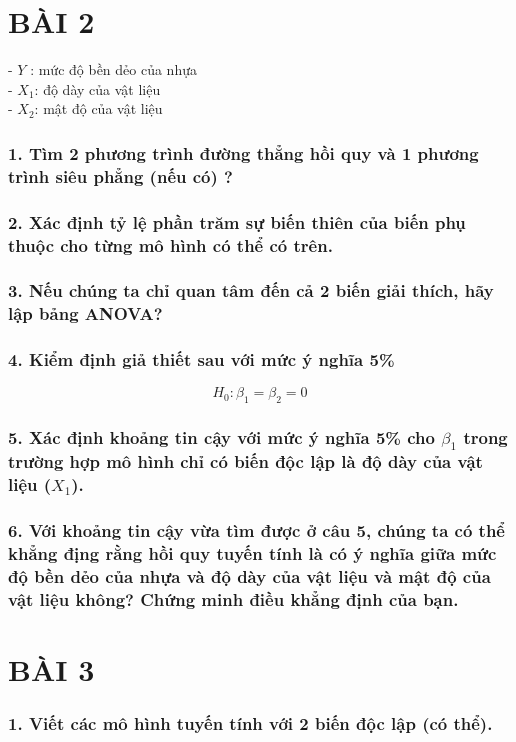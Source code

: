 \documentclass[a4paper]{article}
\theoremstyle{nonumberplain}
\begin{document}
\newpage
\section*{BÀI 2}
- $Y$ : mức độ bền dẻo của nhựa\\
- $X_1$: độ dày của vật liệu\\
- $X_2$: mật độ của vật liệu
\subsubsection*{1. Tìm 2 phương trình đường thẳng hồi quy và 1 phương trình siêu phẳng (nếu có) ?}

\subsubsection*{2. Xác định tỷ lệ phần trăm sự biến thiên của biến phụ thuộc cho từng mô hình có thể có trên.}


\subsubsection*{3. Nếu chúng ta chỉ quan tâm đến cả 2 biến giải thích, hãy lập bảng ANOVA?}

\subsubsection*{4. Kiểm định giả thiết sau với mức ý nghĩa 5\%}
$$H_0 : \beta_1 = \beta_2= 0 $$

\subsubsection*{5. Xác định khoảng tin cậy với mức ý nghĩa 5\% cho $\beta_1$ trong trường hợp mô hình chỉ có biến độc lập là độ dày của vật liệu ($X_1$).}


\subsubsection*{6. Với khoảng tin cậy vừa tìm được ở câu 5, chúng ta có thể khẳng địng rằng hồi quy tuyến tính là có ý nghĩa giữa mức độ bền dẻo của nhựa và độ dày của vật liệu và mật độ của vật liệu không? Chứng minh điều khẳng định của bạn.}


\newpage
\section*{BÀI 3}


\subsubsection*{1. Viết các mô hình tuyến tính với 2 biến độc lập (có thể).}
\end{document}
